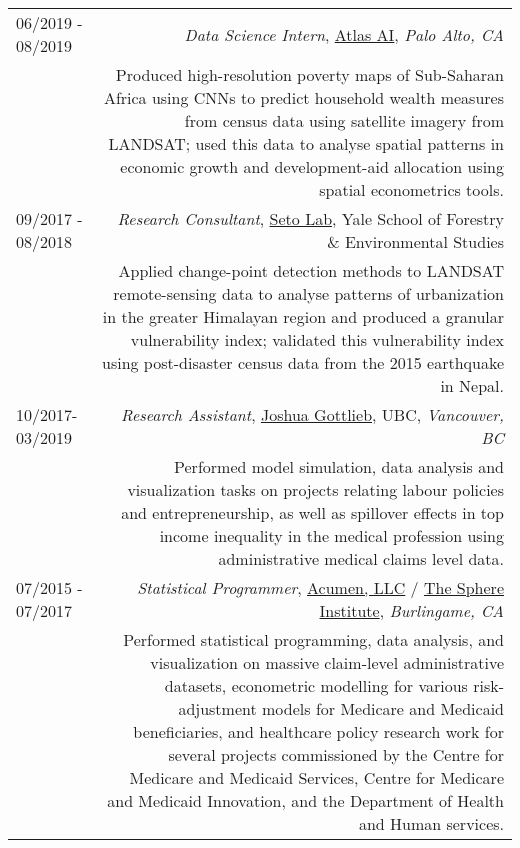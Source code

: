 \begin{longtable}{L!{\VRule}R}
06/2019 - 08/2019 & \emph{Data Science Intern},
\href{https://www.atlasai.co/}{Atlas AI}, \emph{Palo Alto, CA} \\ &
\small Produced high-resolution poverty maps of Sub-Saharan Africa
using CNNs to predict household wealth measures from census data using
satellite imagery from LANDSAT; used this data to analyse spatial
patterns in economic growth and development-aid allocation using
spatial econometrics tools.\\[2pt]

09/2017 - 08/2018 &
\emph{Research Consultant}, \href{http://urban.yale.edu/} {Seto Lab}, Yale
School of Forestry \& Environmental Studies \\
& \small Applied change-point detection methods to LANDSAT
remote-sensing data to analyse patterns of urbanization in the greater
Himalayan region and produced a granular vulnerability index;
validated this vulnerability index using post-disaster census data
from the 2015 earthquake in Nepal. \\[2pt]

10/2017- 03/2019 &
\emph{Research Assistant},
\href{http://www.joshuagottlieb.ca/}{Joshua Gottlieb}, UBC,
\emph{Vancouver, BC} \\
& \small Performed model simulation, data analysis and visualization
tasks on projects relating labour policies and entrepreneurship, as
well as spillover effects in top income inequality in the medical
profession using administrative medical claims level data. \\[2pt]

07/2015 - 07/2017 &
\emph{Statistical Programmer}, \href{https://www.acumenllc.com/}{Acumen, LLC}  /
  \href{https://www.sphereinstitute.org/}{The Sphere Institute},
\emph{Burlingame, CA} \\
& \small Performed statistical programming, data analysis, and
visualization on massive claim-level administrative datasets,
econometric modelling for various risk-adjustment models for Medicare
and Medicaid beneficiaries, and healthcare policy research work for
several projects commissioned by the Centre for Medicare and Medicaid
Services, Centre for Medicare and Medicaid Innovation, and the
Department of Health and Human services. \\[2pt]



\end{longtable}
